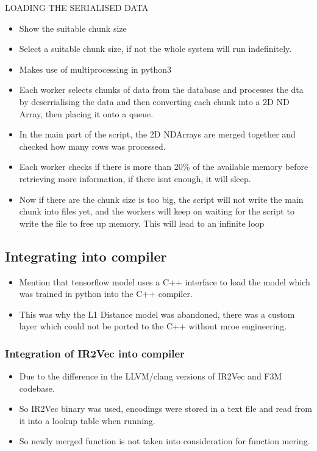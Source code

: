 LOADING THE SERIALISED DATA
\begin{itemize}
    \item Show the suitable chunk size
    \item Select a suitable chunk size, if not the whole system will run indefinitely.
    \item Makes use of multiprocessing in python3
    \item Each worker selects chunks of data from the database and processes the dta by deserrialising the data and then converting each chunk into a 2D ND Array, then placing it onto a queue.
    \item In the main part of the script, the 2D NDArrays are merged together and checked how many rows was processed. 
    \item Each worker checks if there is more than 20\% of the available memory before retrieving more information, if there isnt enough, it will sleep. 
    \item Now if there are the chunk size is too big, the script will not write the main chunk into files yet, and the workers will keep on waiting for the script to write the file to free up memory. This will lead to an infinite loop
\end{itemize}


\subsection{Integrating into compiler}
\begin{itemize}
    \item Mention that tensorflow model uses a C++ interface to load the model which was trained in python into the C++ compiler.
    \item  This was why the L1 Distance model was abandoned, there was a custom layer which could not be ported to the C++ without mroe engineering.
\end{itemize}

\subsubsection{Integration of IR2Vec into compiler}
\begin{itemize}
    \item Due to the difference in the LLVM/clang versions of IR2Vec and F3M codebase.
    \item So IR2Vec binary was used, encodings were stored in a text file and read from it into a lookup table when running.
    \item So newly merged function is not taken into consideration for function mering.
\end{itemize}
 

